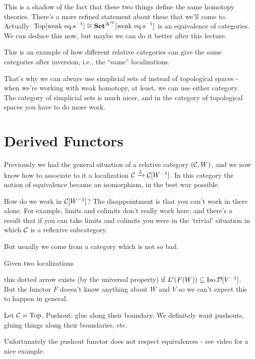 \documentclass[class=report, crop=false,a4paper,twoside]{standalone}
\begin{document}
This is a shadow of the fact that these two things define the same homotopy theories. There's a more refined statement about these that we'll come to. Actually: $\operatorname{Top}[\text{weak eq.s}^{-1}] \cong \mathbf{Set}^{\Delta^{op}}[\text{weak eq.s}^{-1}]$ is an equivalence of categories. We can deduce this now, but maybe we can do it better after this lecture.

This is an example of how different relative categories can give the same categories after inversion, i.e., the ``same'' localizations. 

That's why we can always use simplicial sets of instead of topological spaces - when we're working with weak homotopy, at least, we can use either category. The category of simplicial sets is much nicer, and in the category of topological spaces you have to do more work.

\section{Derived Functors}
Previously we had the general situation of a relative category $(\mathcal{C},W)$, and we now know how to associate to it a localization $\mathcal{C} \xrightarrow{L} \mathcal{C}[W^{-1}]$. In this category the notion of equivalence became an isomorphism, in the best way possible.

How do we work in $\mathcal{C}[W^{-1}]$? The disappointment is that you can't work in there alone. For example, limits and colimits don't really work here, and there's a result that if you can take limits and colimits you were in the `trivial' situation in which $\mathcal{C}$ is a reflexive subcategory.

But usually we come from a category which is not so bad.

Given two localizations
\begin{center}
\end{center}
this dotted arrow exists (by the universal property) if $L'(F(W)) \subseteq \operatorname{Iso}\mathcal{D}[V^{-1}]$. But the functor $F$ doesn't know anything about $W$ and $V$ so we can't expect this to happen in general.

\begin{example}[(Colimits)]
	Let $\mathcal{C} = \operatorname{Top}$. Pushout: glue along their boundary. We definitely want pushouts, gluing things along their boundaries, etc.
	\begin{minipage}[t]{0.5\textwidth}
		
	\end{minipage}
	\begin{minipage}[t]{0.5\textwidth}
		
	\end{minipage}

	Unfortunately the pushout functor does not respect equivalences - see video for a nice example.
	
\end{example}
\end{document}
